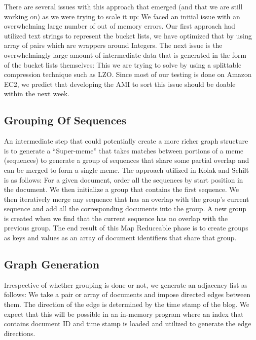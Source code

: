 \documentclass{acm_proc_article-sp}
\begin{document}
 There are several issues with this approach that emerged (and that we are still working on) as we were trying to scale it up: We faced an initial issue with an overwhelming large number of out of memory errors. Our first approach had utilized text strings to represent the bucket lists, we have optimized that by using array of pairs which are wrappers around Integers. The next issue is the overwhelmingly large amount of intermediate data that is generated in the form of the bucket lists themselves: This we are trying to solve by using a splittable compression technique such as LZO. Since most of our testing is done on Amazon EC2, we predict that developing the AMI to sort this issue should be doable within the next week. 
 
 \subsection{Grouping Of Sequences}
 An intermediate step that could potentially create a more richer graph structure is to generate a ``Super-meme'' that takes matches between portions of a meme (sequences) to generate a group of sequences that share some partial overlap and can be merged to form a single meme. The approach utilized in Kolak and Schilt \cite{kolak2008generating} is as follows: For a given document, order all the sequences by start position in the document. We then initialize a group that contains the first sequence. We then iteratively merge any sequence that has an overlap with the group's current sequence and add all the corresponding documents into the group. A new group is created when we find that the current sequence has no overlap with the previous group. The end result of this Map Reduceable phase is to create groups as keys and values as an array of document identifiers that share that group. 
 
 \subsection{Graph Generation}
 Irrespective of whether grouping is done or not, we generate an adjacency list as follows: We take a pair or array of documents and impose directed edges between them. The direction of the edge is determined by the time stamp of the blog. We expect that this will be possible in an in-memory program where an index that contains document ID and time stamp is loaded and utilized to generate the edge directions. 






%

%
%
\end{document}
